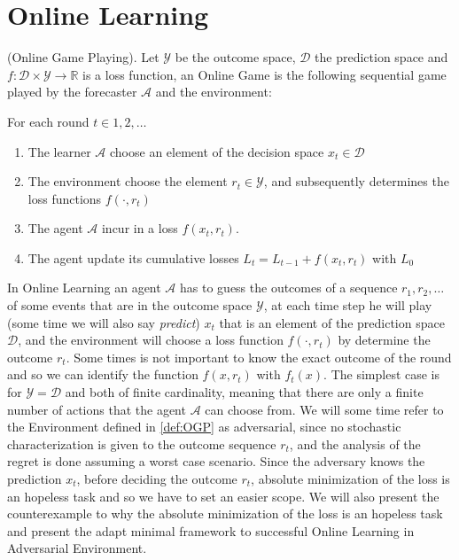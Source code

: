 \section{Online Learning}
\label{sec:OnlineLearning}
\begin{definition}(Online Game Playing).\label{def:OGP}
    Let $\mathcal Y$ be the outcome space, $\mathcal D$ the prediction space and $f:\mathcal D\times\mathcal Y\to \mathbb R$ is a loss function, an Online Game is the following sequential game played by the forecaster $\mathcal A$ and the environment:

    For each round $t\in 1,2,\ldots$
    \begin{enumerate}
        \item The learner $\mathcal A$ choose an element of the decision space $x_t\in\mathcal D$
        \item The environment choose the element $r_t\in\mathcal Y$, and subsequently determines the loss functions $f(\cdot,r_t)$
        \item The agent $\mathcal A$ incur in a loss $f(x_t,r_t)$.
		\item The agent update its cumulative losses $L_t=L_{t-1}+f(x_t,r_t)$ with $L_0$
    \end{enumerate}
\end{definition}

In Online Learning an agent $\mathcal A$ has to guess the outcomes of a sequence $r_1,r_2,\ldots$ of some events that are in the outcome space $\mathcal Y$, at each time step he will play (some time we will also say \emph{predict}) $x_t$ that is an element of the prediction space $\mathcal D$, and the environment will choose a loss function $f(\cdot,r_t)$ by determine the outcome $r_t$.
Some times is not important to know the exact outcome of the round and so we can identify the function $f(x,r_t)$ with $f_t(x)$.
The simplest case is for $\mathcal Y=\mathcal D$ and both of finite cardinality, meaning that there are only a finite number of actions that the agent $\mathcal A$ can choose from. 
We will some time refer to the Environment defined in \ref{def:OGP} as adversarial, since no stochastic characterization is given to the outcome sequence $r_t$, and the analysis of the regret is done assuming a worst case scenario.
Since the adversary knows the prediction $x_t$, before deciding the outcome $r_t$, absolute minimization of the loss is an hopeless task and so we have to set an easier scope. We will also present the counterexample to why the absolute minimization of the loss is an hopeless task and present the adapt minimal framework to successful Online Learning in Adversarial Environment.


